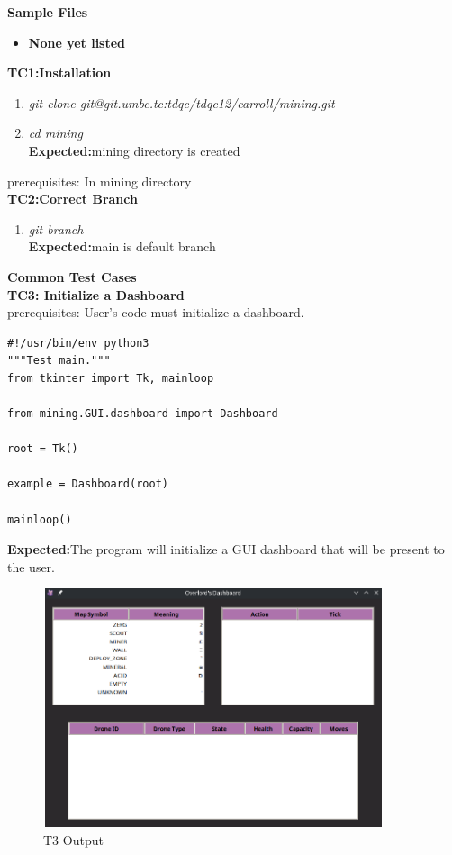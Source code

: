 \documentclass{article}
\begin{document}
\noindent\Large\textbf{Sample Files}
\begin{itemize}
  \item \textbf{None yet listed}\\
\end{itemize}

\Large\textbf{TC1:Installation}
\begin{enumerate}
    \item \textit{git clone git@git.umbc.tc:tdqc/tdqc12/carroll/mining.git}
    \item \textit{cd mining}\\
    \textbf{Expected:}{mining directory is created}\\
\end{enumerate}
\large{prerequisites: In mining directory}\\
\Large\textbf{TC2:Correct Branch}
\begin{enumerate}
    \item \textit{git branch}\\
    \textbf{Expected:}{main is default branch}
\end{enumerate}
\noindent\huge\textbf{Common Test Cases}\\
\newpage
\Large\textbf{TC3: Initialize a Dashboard}\\
\indent\large{prerequisites: User's code must initialize a dashboard.}\\
\begin{lstlisting}
#!/usr/bin/env python3
"""Test main."""
from tkinter import Tk, mainloop

from mining.GUI.dashboard import Dashboard

root = Tk()

example = Dashboard(root)

mainloop()
\end{lstlisting}
\begin{description}
    \textbf{Expected:}{The program will initialize a GUI dashboard that will be present to the user.}
    \begin{figure}[htp]
    \includegraphics[width=10cm, height=7cm]{testcase3.png}
    
    \caption{T3 Output}
    \label{fig:galaxy}
\end{figure}
\end{description}
\end{document}
